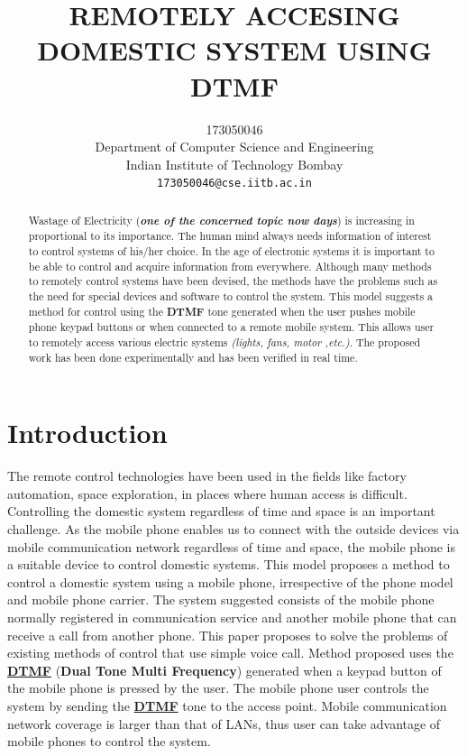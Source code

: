 \documentclass[11pt]{article}
\title{REMOTELY ACCESING DOMESTIC SYSTEM  USING DTMF}
\author{
 173050046\\
 Department of Computer Science and Engineering\\
 Indian Institute of Technology Bombay\\
 {\small \tt  {173050046}@cse.iitb.ac.in} }
\begin{document}
\maketitle

\begin{abstract}
Wastage of Electricity (\textbf{\textit{one of the concerned topic now days}}) is increasing in proportional to its importance. The human mind always needs information of interest to control systems of his/her choice. In the age of electronic systems it is important to be able to control and acquire information from everywhere. Although many methods to remotely control systems have been devised, the methods have the problems such as the need for special devices and software to control the system. This model suggests a method for control using the\textbf{ DTMF }tone generated when the user pushes mobile phone keypad buttons or when connected to a remote mobile system. This allows user to remotely access various electric systems \textit{(lights, fans, motor ,etc.)}. The proposed work has been done experimentally and has been verified in real time. 
\end{abstract}


\section{Introduction}
The remote control technologies have been used in the fields like factory automation, space exploration, in places where human access is difficult. Controlling the domestic system regardless of time and space is an important challenge. As the mobile phone enables us to connect with the outside devices via mobile communication network regardless of time and space, the mobile phone is a suitable device to control domestic systems.
This model proposes a method to control a domestic system using a mobile phone, irrespective of the phone model and mobile phone carrier. The system suggested consists of the mobile phone normally registered in communication service and another mobile phone that can receive a call from another phone. This paper proposes to solve the problems of existing methods of control that use simple voice call. Method proposed uses the \textbf{\underline{DTMF}} (\textbf{Dual Tone Multi Frequency}) generated when a keypad button of the mobile phone is pressed by the user. The mobile phone user controls the system by sending the \textbf{\underline{DTMF}} tone to the access point. Mobile communication network coverage is larger than that of LANs, thus user can take advantage of mobile phones to control the system.
\end{document}
